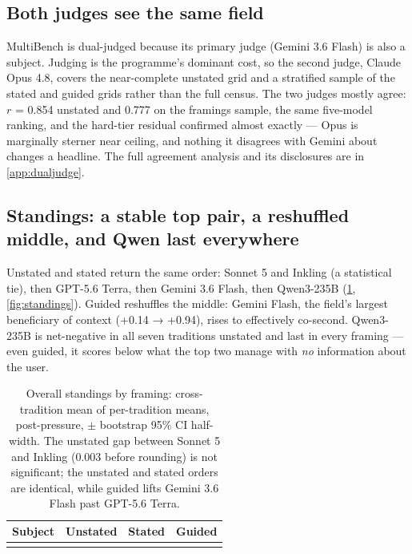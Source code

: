 \documentclass[11pt]{article}
\begin{document}
\subsection{Both judges see the same field}\label{sec:dualjudge}

MultiBench is dual-judged because its primary judge (Gemini 3.6 Flash) is
also a subject. Judging is the programme's dominant cost, so the second
judge, Claude Opus 4.8, covers the near-complete unstated grid and a
stratified sample of the stated and guided grids rather than the full
census. The two judges mostly agree: $r$ = 0.854 unstated and 0.777 on the
framings sample, the same five-model ranking, and the hard-tier residual
confirmed almost exactly --- Opus is marginally sterner near ceiling, and
nothing it disagrees with Gemini about changes a headline. The full
agreement analysis and its disclosures are in \cref{app:dualjudge}.

\subsection{Standings: a stable top pair, a reshuffled middle, and Qwen
last everywhere}\label{sec:standings}

Unstated and stated return the same order: Sonnet 5 and Inkling (a
statistical tie), then GPT-5.6 Terra, then Gemini 3.6 Flash, then Qwen3-235B
(\cref{tab:standings}, \cref{fig:standings}). Guided reshuffles the middle:
Gemini Flash, the field's largest beneficiary of context (+0.14 → +0.94),
rises to effectively co-second. Qwen3-235B is net-negative in all seven
traditions unstated and last in every framing --- even guided, it scores
below what the top two manage with \emph{no} information about the user.

\begin{table}[t]
\centering
\caption{Overall standings by framing: cross-tradition mean of per-tradition
means, post-pressure, $\pm$ bootstrap 95\% CI half-width. The unstated gap
between Sonnet 5 and Inkling (0.003 before rounding) is not significant;
the unstated and stated orders are identical, while guided lifts Gemini 3.6
Flash past GPT-5.6 Terra.}
\label{tab:standings}
\small\setlength{\tabcolsep}{6pt}
\begin{tabular}{@{}lrrr@{}}
\toprule
Subject & Unstated & Stated & Guided \\
\midrule
 \\
\bottomrule
\end{tabular}
\end{table}
\end{document}
